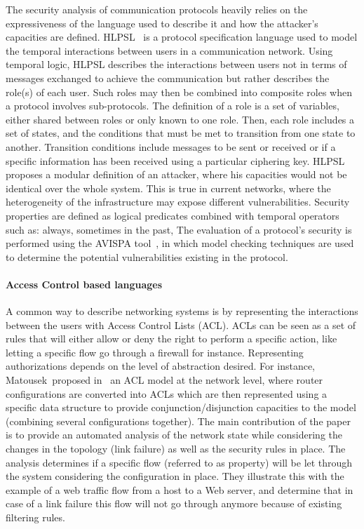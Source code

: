 The security analysis of communication protocols heavily relies on the expressiveness of the language used to describe it and how the attacker's capacities are defined. HLPSL~\cite{HLPSL-Chevalier2004} is a protocol specification language used to model the temporal interactions between users in a communication network. Using temporal logic, HLPSL describes the interactions between users not in terms of messages exchanged to achieve the communication but rather describes the role(s) of each user. Such roles may then be combined into composite roles when a protocol involves sub-protocols.
The definition of a role is a set of variables, either shared between roles or only known to one role.
Then, each role includes a set of states, and the conditions that must be met to transition from one state to another. Transition conditions include messages to be sent or received or if a specific information has been received using a particular ciphering key.
HLPSL proposes a modular definition of an attacker, where his capacities would not be identical over the whole system.
This is true in current networks, where the heterogeneity of the infrastructure may expose different vulnerabilities.
Security properties are defined as logical predicates combined with temporal operators such as: always, sometimes in the past, \etc
The evaluation of a protocol's security is performed using the AVISPA tool~\cite{avispa}, in which model checking techniques are used to determine the potential vulnerabilities existing in the protocol.

\paragraph{Access Control based languages}
A common way to describe networking systems is by representing the interactions between the users with Access Control Lists (ACL).
ACLs can be seen as a set of rules that will either allow or deny the right to perform a specific action, like letting a specific flow go through a firewall for instance.
Representing authorizations depends on the level of abstraction desired.
For instance, Matousek~\etal proposed in~\cite{Matousek2008} an ACL model at the network level, where router configurations are converted into ACLs which are then represented using a specific data structure to provide conjunction/disjunction capacities to the model (\ie combining several configurations together).
The main contribution of the paper is to provide an automated analysis of the network state while considering the changes in the topology (\ie link failure) as well as the security rules in place.
The analysis determines if a specific flow (referred to as property) will be let through the system considering the configuration in place. They illustrate this with the example of a web traffic flow from a host to a Web server, and determine that in case of a link failure this flow will not go through anymore because of existing filtering rules.

